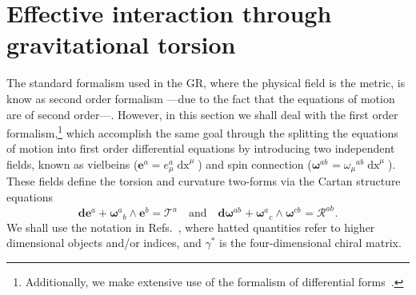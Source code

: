 \documentclass{ws-mpla}
\newcommand{\df}[1][]{\mathbf{d}{#1}}
\newcommand{\ga}{\gamma}
\newcommand{\we}{{\scriptstyle\wedge}}
\newcommand\vi[2]{e^{{#1}}_{{#2}}}
\newcommand\vif[1]{\boldsymbol{e}^{{#1}}}
\newcommand\spi[1]{\omega_{{#1}}}
\newcommand\spif[2]{{\boldsymbol{\omega}}^{{#1}}{}_{{#2}}}
\newcommand{\Rif}[2]{\boldsymbol{\mathcal{R}}^{{#1}}{}_{{#2}}}
\newcommand{\Tf}[1]{\boldsymbol{\mathcal{T}}^{#1}}
\renewcommand{\(}{\left(}
\renewcommand{\)}{\right)}
\renewcommand{\[}{\left[}
\renewcommand{\]}{\right]}
\newcommand*{\de}[1]{\mathop{\mathrm{d}#1}\nolimits}
\begin{document}
\section{Effective interaction through gravitational torsion}\label{CEG}

The standard formalism used in the GR, where the physical field is the metric, is know as second order formalism ---due to the fact that the equations of motion are of second order---. However, in this section we shall deal with the first order formalism,\footnote{Additionally, we make extensive use of the formalism of differential forms~\cite{Cartan-calc,Zanelli:2005sa}.} which accomplish the same goal through the splitting the equations of motion into first order differential equations  by introducing two independent fields, known as vielbeins \mbox{($\vif{a} = \vi{a}{\mu}\de{x}^\mu$)} and spin connection \mbox{($\spif{ab}{} = \spi{\mu}{}^{ab}\de{x}^\mu$).} These fields define the torsion and curvature two-forms via the Cartan structure equations
\begin{equation}
  \df[\vif{a}] + \spif{a}{b} \we \vif{b} = \Tf{a} \quad \text{and} \quad \df[\spif{ab}{}] + \spif{a}{c} \we \spif{cb}{} = \Rif{ab}{}.
\end{equation}
We shall use the notation in Refs.~, where hatted quantities refer to higher dimensional objects and/or indices, and $\ga^{*}$ is the four-dimensional chiral matrix.
\end{document}

